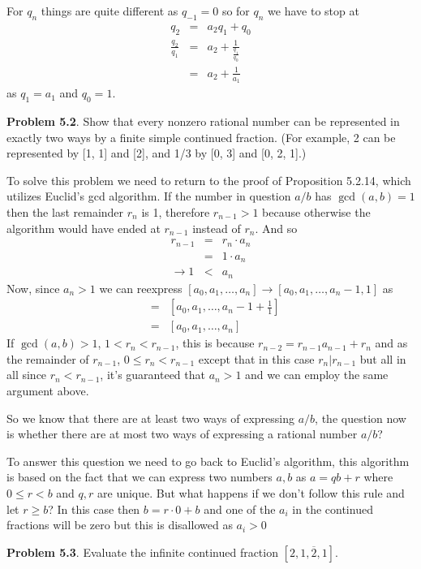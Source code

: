 \documentclass[aps,preprint,preprintnumbers,nofootinbib,showpacs,prd]{revtex4-1}
\newcommand{\nbea}{\begin{eqnarray*}}
\newcommand{\neea}{\end{eqnarray*}}
\begin{document}
For $q_n$ things are quite different as $q_{-1} = 0$ so for $q_n$ we have to stop at
%
\nbea
q_2 & = & a_2q_1 + q_0 \\
\frac{q_2}{q_1} & = & a_2 + \frac{1}{\frac{q_1}{q_0}} \\
& = & a_2 + \frac{1}{a_1}
\neea
%
as $q_1 = a_1$ and $q_0 = 1$.


{\bf Problem 5.2}. Show that every nonzero rational number can be represented in exactly two ways by a finite simple continued fraction. (For example, 2 can be represented by [1, 1] and [2], and 1/3 by [0, 3] and [0, 2, 1].)

To solve this problem we need to return to the proof of Proposition 5.2.14, which utilizes Euclid's gcd algorithm. If the number in question $a/b$ has $\gcd(a,b)=1$ then the last remainder $r_n$ is 1, therefore $r_{n-1} > 1$ because otherwise the algorithm would have ended at $r_{n-1}$ instead of $r_n$. And so
%
\nbea
r_{n-1} & = & r_n \cdot a_n \\
& = & 1 \cdot a_n \\
\to 1 & < & a_n
\neea
%
Now, since $a_n > 1$ we can reexpress $[a_0, a_1, \dots, a_n] \to [a_0, a_1, \dots, a_n-1, 1]$ as
%
\nbea
[a_0, a_1, \dots, a_n-1, 1] & = &  [a_0, a_1, \dots, a_n-1 + \frac{1}{1}] \\
& = & [a_0, a_1, \dots, a_n]
\neea
%
If $\gcd(a,b) > 1$, $1 < r_n < r_{n-1}$, this is because $r_{n-2} = r_{n-1}a_{n-1} + r_n$ and as the remainder of $r_{n-1}$, $0 \le r_n < r_{n-1}$ except that in this case $r_n | r_{n-1}$ but all in all since $r_n < r_{n-1}$, it's guaranteed that $a_n > 1$ and we can employ the same argument above.

So we know that there are at least two ways of expressing $a/b$, the question now is whether there are at most two ways of expressing a rational number $a/b$?

To answer this question we need to go back to Euclid's algorithm, this algorithm is based on the fact that we can express two numbers $a,b$ as $a = qb + r$ where $0 \le r < b$ and $q,r$ are unique. But what happens if we don't follow this rule and let $r \ge b$? In this case then $b = r\cdot 0 + b$ and one of the $a_i$ in the continued fractions will be zero but this is disallowed as $a_i > 0$

{\bf Problem 5.3}. Evaluate the inﬁnite continued fraction $[2, \overline{1, 2, 1}]$.
\end{document}
